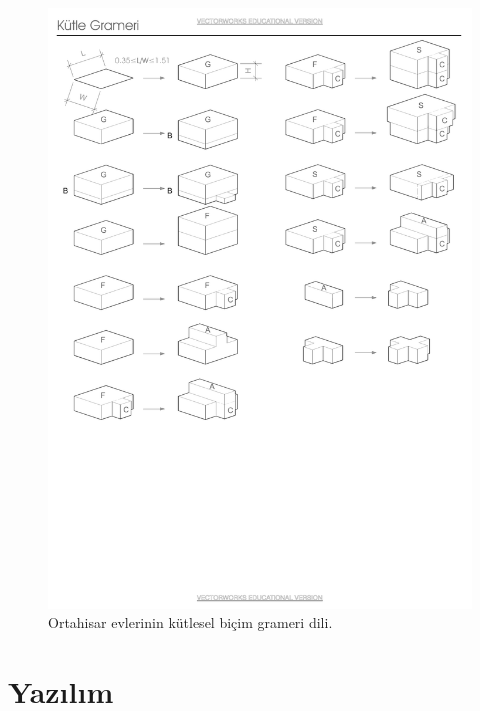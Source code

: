 \documentclass[12pt,turkish,a4paperpaper,]{report}
\begin{document}
\begin{figure}
\centering
\includegraphics[width=1\textwidth,height=\textheight]{source/figures/bicimgrameri.pdf}
\caption{Ortahisar evlerinin kütlesel biçim grameri dili.
\label{bicimgrameri}}
\end{figure}

\newpage

\hypertarget{yazux131lux131m}{%
\section{Yazılım}\label{yazux131lux131m}}
\end{document}
